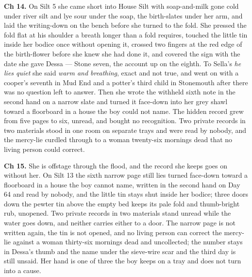 \documentclass{design/chronicle}
\begin{document}
{\textbf{Ch 14.} On Silt 5 she came short into House Silt with soap-and-milk gone cold under river silt and lye sour under the soap, the birth-slates under her arm, and laid the writing-down on the bench before she turned to the fold. She pressed the fold flat at his shoulder a breath longer than a fold requires, touched the little tin inside her bodice once without opening it, crossed two fingers at the red edge of the birth-flower before she knew she had done it, and covered the sign with the date she gave Dessa — Stone seven, the account up on the eighth. To Sella’s \emph{he lies quiet} she said \emph{warm and breathing}, exact and not true, and went on with a cooper’s seventh in Mud End and a potter’s third child in Stonemouth after there was no question left to answer. Then she wrote the withheld sixth note in the second hand on a narrow slate and turned it face-down into her grey shawl toward a floorboard in a house the boy could not name. The hidden record grew from five pages to six, unread, and bought no recognition. Two private records in two materials stood in one room on separate trays and were read by nobody, and the mercy-lie curdled through to a woman twenty-six mornings dead that no living person could correct.

\textbf{Ch 15.} She is offstage through the flood, and the record she keeps goes on without her. On Silt 13 the sixth narrow page still lies turned face-down toward a floorboard in a house the boy cannot name, written in the second hand on Day 64 and read by nobody, and the little tin stays shut inside her bodice; three doors down the pewter tin above the empty bed keeps its pale fold and thumb-bright rub, unopened. Two private records in two materials stand unread while the water goes down, and neither carries either to a door. The narrow page is not written again, the tin is not opened, and no living person can correct the mercy-lie against a woman thirty-six mornings dead and uncollected; the number stays in Dessa’s thumb and the name under the sieve-wire scar and the third day is still unsaid. Her hand is one of three the boy keeps on a tray and does not turn into a cause.

}
\end{document}
